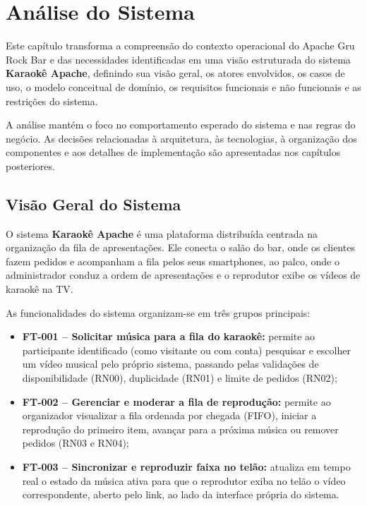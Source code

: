 \chapter{Análise do Sistema} \label{cap:analise}

Este capítulo transforma a compreensão do contexto operacional do Apache Gru Rock Bar e das necessidades identificadas em uma visão estruturada do sistema \textbf{Karaokê Apache}, definindo sua visão geral, os atores envolvidos, os casos de uso, o modelo conceitual de domínio, os requisitos funcionais e não funcionais e as restrições do sistema.

A análise mantém o foco no comportamento esperado do sistema e nas regras do negócio. As decisões relacionadas à arquitetura, às tecnologias, à organização dos componentes e aos detalhes de implementação são apresentadas nos capítulos posteriores.

\section{Visão Geral do Sistema}

O sistema \textbf{Karaokê Apache} é uma plataforma distribuída centrada na organização da fila de apresentações. Ele conecta o salão do bar, onde os clientes fazem pedidos e acompanham a fila pelos seus smartphones, ao palco, onde o administrador conduz a ordem de apresentações e o reprodutor exibe os vídeos de karaokê na TV.

As funcionalidades do sistema organizam-se em três grupos principais:

\begin{itemize}
  \item \textbf{FT-001 -- Solicitar música para a fila do karaokê:} permite ao participante identificado (como visitante ou com conta) pesquisar e escolher um vídeo musical pelo próprio sistema, passando pelas validações de disponibilidade (RN00), duplicidade (RN01) e limite de pedidos (RN02);
  \item \textbf{FT-002 -- Gerenciar e moderar a fila de reprodução:} permite ao organizador visualizar a fila ordenada por chegada (FIFO), iniciar a reprodução do primeiro item, avançar para a próxima música ou remover pedidos (RN03 e RN04);
  \item \textbf{FT-003 -- Sincronizar e reproduzir faixa no telão:} atualiza em tempo real o estado da música ativa para que o reprodutor exiba no telão o vídeo correspondente, aberto pelo link, ao lado da interface própria do sistema.
\end{itemize}

